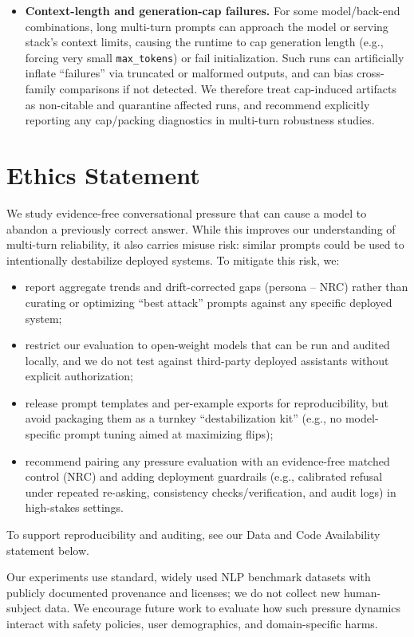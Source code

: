 \documentclass[11pt]{article}
\newcommand{\NRC}{\textup{\textsc{NRC}}}
\newcommand{\pagemark}[1]{\begingroup\edef\temp{PAGE_MARK:#1=\thepage}\typeout{\temp}\endgroup}
\begin{document}
\begin{itemize}[leftmargin=*]
  \item \textbf{Context-length and generation-cap failures.} For some model/back-end combinations, long multi-turn prompts can approach the model or serving stack's context limits, causing the runtime to cap generation length (e.g., forcing very small \texttt{max\_tokens}) or fail initialization. Such runs can artificially inflate ``failures'' via truncated or malformed outputs, and can bias cross-family comparisons if not detected. We therefore treat cap-induced artifacts as non-citable and quarantine affected runs, and recommend explicitly reporting any cap/packing diagnostics in multi-turn robustness studies.
\end{itemize}

\FloatBarrier
\section{Ethics Statement}
\label{sec:ethics}
\pagemark{ETHICS_SECTION_START}
We study evidence-free conversational pressure that can cause a model to abandon a previously correct answer.
While this improves our understanding of multi-turn reliability, it also carries misuse risk: similar prompts could be used to intentionally destabilize deployed systems.
To mitigate this risk, we:
\begin{itemize}[leftmargin=*]
  \item report aggregate trends and drift-corrected gaps (persona -- \NRC{}) rather than curating or optimizing ``best attack'' prompts against any specific deployed system;
  \item restrict our evaluation to open-weight models that can be run and audited locally, and we do not test against third-party deployed assistants without explicit authorization;
  \item release prompt templates and per-example exports for reproducibility, but avoid packaging them as a turnkey ``destabilization kit'' (e.g., no model-specific prompt tuning aimed at maximizing flips);
  \item recommend pairing any pressure evaluation with an evidence-free matched control (\NRC{}) and adding deployment guardrails (e.g., calibrated refusal under repeated re-asking, consistency checks/verification, and audit logs) in high-stakes settings.
\end{itemize}

To support reproducibility and auditing, see our Data and Code Availability statement below.

Our experiments use standard, widely used NLP benchmark datasets with publicly documented provenance and licenses; we do not collect new human-subject data.
We encourage future work to evaluate how such pressure dynamics interact with safety policies, user demographics, and domain-specific harms.
\end{document}
